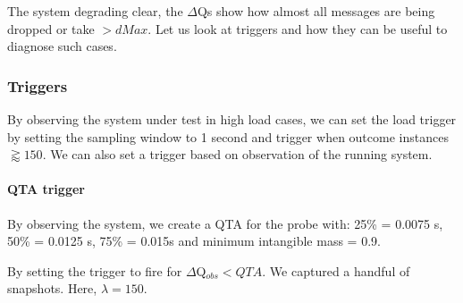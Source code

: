     The system degrading clear, the $\Delta$Qs show how almost all messages are being dropped or take $> dMax$. Let us look at triggers and how they can be useful to diagnose such cases.
  
    \subsubsection{Triggers}
        By observing the system under test in high load cases, we can set the load trigger by setting the sampling window to 1 second and trigger when outcome instances $\gtrapprox 150$. We can also set a trigger based on observation of the running system.

        \paragraph{QTA trigger}
            By observing the system, we create a QTA for the probe with: 25\% = 0.0075 s, 50\% = 0.0125 s, 75\% = 0.015s and minimum intangible mass = 0.9.

            By setting the trigger to fire for $\Delta$Q$_{obs} < QTA$. We captured a handful of snapshots. Here, $\lambda = 150$.
        
